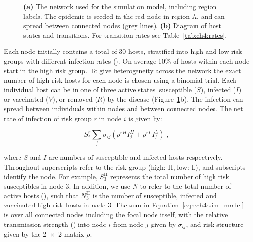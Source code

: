\begin{figure}[htb]
    \centering
    \hspace{0em}
    \caption{\textbf{(a)} The network used for the simulation model, including region labels. The epidemic is seeded in the red node in region A, and can spread between connected nodes (grey lines). \textbf{(b)} Diagram of host states and transitions. For transition rates see Table~\ref{tab:ch4:rates}. }
    \label{fig:ch4:node_structure_and_model}
\end{figure}

Each node initially contains a total of 30 hosts, stratified into high and low risk groups with different infection rates (). On average 10\% of hosts within each node start in the high risk group. To give heterogeneity across the network the exact number of high risk hosts for each node is chosen using a binomial trial. Each individual host can be in one of three active states: susceptible ($S$), infected ($I$) or vaccinated ($V$), or removed ($R$) by the disease (Figure~\ref{fig:ch4:node_structure_and_model}b). The infection can spread between individuals within nodes and between connected nodes. The net rate of infection of risk group $r$ in node $i$ is given by:
\begin{linenomath*}
    \begin{equation}
        S_i^r \sum_j \sigma_{ij} \left(\rho^{rH}I_j^H + \rho^{rL}I_j^L\right)\;,
    \label{eqn:ch4:sim_model}
    \end{equation}
\end{linenomath*}
where $S$ and $I$ are numbers of susceptible and infected hosts respectively. Throughout superscripts refer to the risk group (high: H, low: L), and subscripts identify the node. For example, $S_{3}^\mathrm{H}$ represents the total number of high risk susceptibles in node 3. In addition, we use $N$ to refer to the total number of active hosts (), such that $N_{3}^\mathrm{H}$ is the number of susceptible, infected and vaccinated high risk hosts in node 3. The sum in Equation~\ref{eqn:ch4:sim_model} is over all connected nodes including the focal node itself, with the relative transmission strength () into node $i$ from node $j$ given by $\sigma_{ij}$, and risk structure given by the \num{2x2} matrix $\rho$.

